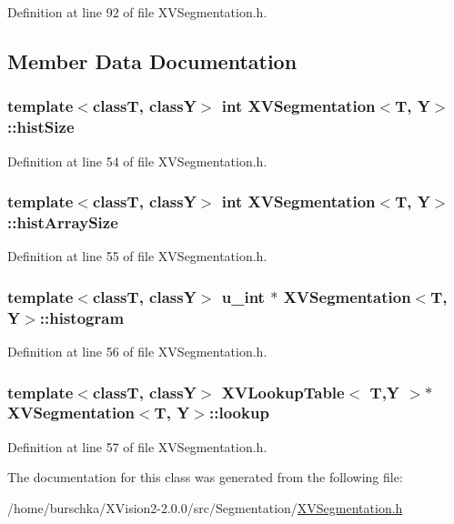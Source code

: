 Definition at line 92 of file XVSegmentation.h.

\subsection{Member Data Documentation}
\label{XVSegmentation_n0}
\hypertarget{class_XVSegmentation_n0}{
\subsubsection[histSize]{\setlength{\rightskip}{0pt plus 5cm}template$<$classT, classY$>$ int XVSegmentation$<$T, Y$>$::hist\-Size}}




Definition at line 54 of file XVSegmentation.h.\label{XVSegmentation_n1}
\hypertarget{class_XVSegmentation_n1}{
\subsubsection[histArraySize]{\setlength{\rightskip}{0pt plus 5cm}template$<$classT, classY$>$ int XVSegmentation$<$T, Y$>$::hist\-Array\-Size}}




Definition at line 55 of file XVSegmentation.h.\label{XVSegmentation_n2}
\hypertarget{class_XVSegmentation_n2}{
\subsubsection[histogram]{\setlength{\rightskip}{0pt plus 5cm}template$<$classT, classY$>$ u\_\-int $\ast$ XVSegmentation$<$T, Y$>$::histogram}}




Definition at line 56 of file XVSegmentation.h.\label{XVSegmentation_n3}
\hypertarget{class_XVSegmentation_n3}{
\subsubsection[lookup]{\setlength{\rightskip}{0pt plus 5cm}template$<$classT, classY$>$ XVLookup\-Table$<$ T,Y $>$$\ast$ XVSegmentation$<$T, Y$>$::lookup}}




Definition at line 57 of file XVSegmentation.h.

The documentation for this class was generated from the following file:\begin{CompactItemize}
\item 
/home/burschka/XVision2-2.0.0/src/Segmentation/\hyperlink{XVSegmentation.h-source}{XVSegmentation.h}\end{CompactItemize}
